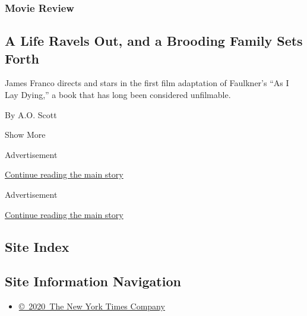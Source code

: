 \begin{enumerate}
  \hypertarget{movie-review}{%
  \subsubsection{Movie Review}\label{movie-review}}

  \hypertarget{a-life-ravels-out-and-a-brooding-family-sets-forth}{%
  \subsection{A Life Ravels Out, and a Brooding Family Sets
  Forth}\label{a-life-ravels-out-and-a-brooding-family-sets-forth}}

  James Franco directs and stars in the first film adaptation of
  Faulkner's ``As I Lay Dying,'' a book that has long been considered
  unfilmable.

  By A.O. Scott
\end{enumerate}

Show More

Advertisement

\protect\hyperlink{after-mid1}{Continue reading the main story}

Advertisement

\protect\hyperlink{after-mktg}{Continue reading the main story}

\hypertarget{site-index}{%
\subsection{Site Index}\label{site-index}}

\hypertarget{site-information-navigation}{%
\subsection{Site Information
Navigation}\label{site-information-navigation}}

\begin{itemize}
\tightlist
\item
  \href{https://help.nytimes3xbfgragh.onion/hc/en-us/articles/115014792127-Copyright-notice}{©~2020~The
  New York Times Company}
\end{itemize}


